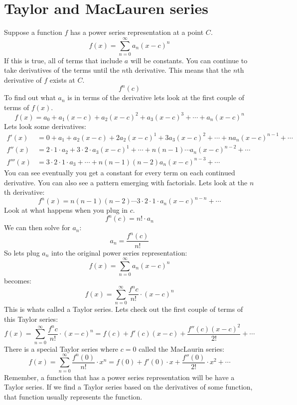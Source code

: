 \documentclass{report}
\begin{document}
\section{Taylor and MacLauren series}
    Suppose a function \(f\) has a power series representation at a point \(C\).
    \[f(x) = \sum_{n=0}^{\infty} a_n(x-c)^n\]
    If this is true, all of terms that include \(a\) will be constants. 
    You can continue to take derivatives of the terms until the \(n\)th derivative.
    This means that the \(n\)th derivative of \(f\) exists at \(C\).
    \[f^n(c)\]
    To find out what \(a_n\) is in terms of the derivative lets look at the first couple of terms of \(f(x)\).
    \[f(x) = a_0 + a_1(x-c) + a_2(x-c)^2 + a_3(x-c)^3 + \cdots + a_n(x-c)^n\]
    Lets look some derivatives:
    \begin{align*}
        f'(x) &= 0 + a_1 + a_2(x-c) + 2a_2(x-c)^1 + 3a_3(x-c)^2 + \cdots + na_n(x-c)^{n-1} + \cdots \\
        f''(x) &= 2 \cdot 1 \cdot a_2 + 3 \cdot 2 \cdot a_3(x-c)^1 + \cdots + n(n-1) \cdots a_n (x-c)^{n-2} + \cdots \\
        f'''(x) &= 3 \cdot 2 \cdot 1 \cdot a_3 + \cdots + n(n-1)(n-2)a_n(x-c)^{n-3} + \cdots
    \end{align*}
    You can see eventually you get a constant for every term on each continued derivative.
    You can also see a pattern emerging with factorials.
    Lets look at the \(n\)th derivative:
    \[f^n(x) = n(n-1)(n-2) \cdots 3 \cdot 2 \cdot 1 \cdot a_n (x-c)^{n-n} + \cdots\]
    Look at what happens when you plug in \(c\).
    \[f^n(c) = n! \cdot a_n  \]
    We can then solve for \(a_n\):
    \[a_n = \frac{f^n(c)}{n!}\]
    So lets plug \(a_n\) into the original power series representation:
    \[f(x) = \sum_{n=0}^{\infty} a_n(x-c)^n\]
    becomes:
    \[f(x) = \sum_{n=0}^{\infty} \frac{f^n{c}}{n!} \cdot (x-c)^n\]
    This is whats called a Taylor series.
    Lets check out the first couple of terms of this Taylor series:
    \[f(x) = \sum_{n=0}^{\infty} \frac{f^n{c}}{n!} \cdot (x-c)^n = f(c) + f'(c)(x-c) + \frac{f''(c)(x-c)^2}{2!} + \cdots\]
    There is a special Taylor series where \(c = 0\) called the MacLaurin series:
    \[f(x) = \sum_{n=0}^{\infty} \frac{f^n(0)}{n!} \cdot x^n = f(0) + f'(0) \cdot x + \frac{f''(0)}{2!}\cdot x^2 + \cdots\]
    Remember, a function that has a power series representation will be have a Taylor series.
    If we find a Taylor series based on the derivatives of some function, that function usually represents the function.
    
\end{document}
